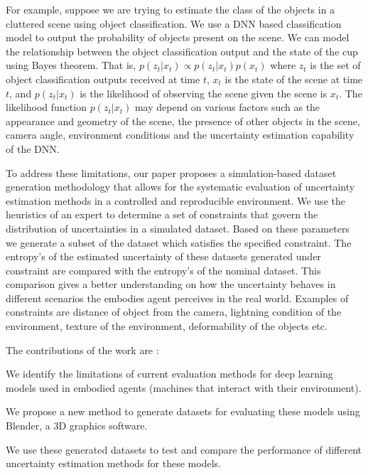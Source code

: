 For example, suppose we are trying to estimate the class of the objects in a cluttered scene using object classification. We use a DNN based classification model to output the probability of objects present on the scene. We can model the relationship between the object classification output and the state of the cup using Bayes theorem. That is, $ p(z_t | x_t) \propto  p(z_t | x_t) p(x_t)$ where $z_t$ is the set of object classification outputs received at time $t$, $x_t$ is the state of the scene at time $t$,  and $p(z_t | x_t)$ is the likelihood of observing the scene given the scene is $x_t$. The likelihood function $p(z_t | x_t)$ may depend on various factors such as the appearance and geometry of the scene, the presence of other objects in the scene, camera angle, environment conditions and the uncertainty estimation capability of the DNN.

To address these limitations, our paper proposes a simulation-based
dataset generation methodology that allows for the systematic evaluation
of uncertainty estimation methods in a controlled and reproducible
environment. We use the heuristics of an expert to determine a set of
constraints that govern the distribution of uncertainties in a simulated
dataset. Based on these parameters we generate a subset of the dataset
which satisfies the specified constraint. The entropy's of the estimated
uncertainty of these datasets generated under constraint are compared
with the entropy's of the nominal dataset. This comparison gives a
better understanding on how the uncertainty behaves in different
scenarios the embodies agent perceives in the real world. Examples of
constraints are distance of object from the camera, lightning condition
of the environment, texture of the environment, deformability of the
objects etc. 

The contributions of the work are : 
\begin{inparaenum}
	\item We identify the limitations of
	current evaluation methods for deep learning models used in embodied
	agents (machines that interact with their environment).
	\item We propose a
	new method to generate datasets for evaluating these models using
	Blender, a 3D graphics software.
	\item  We use these generated datasets to test and
	compare the performance of different uncertainty estimation methods for
	these models.
\end{inparaenum}

